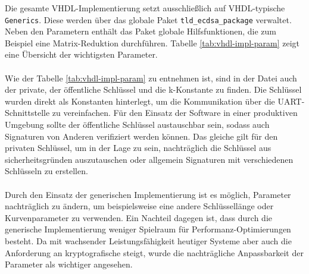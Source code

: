 Die gesamte VHDL-Implementierung setzt ausschließlich auf VHDL-typische \texttt{Generics}. Diese werden über das globale Paket \texttt{tld\_ecdsa\_package} verwaltet. Neben den Parametern enthält das Paket globale Hilfsfunktionen, die zum Beispiel eine Matrix-Reduktion durchführen. Tabelle \ref{tab:vhdl-impl-param} zeigt eine Übersicht der wichtigsten Parameter.
\\ \\
Wie der Tabelle \ref{tab:vhdl-impl-param} zu entnehmen ist, sind in der Datei auch der private, der öffentliche Schlüssel und die k-Konstante  zu finden. Die Schlüssel wurden direkt als Konstanten hinterlegt, um die Kommunikation über die UART-Schnittstelle zu vereinfachen. Für den Einsatz der Software in einer produktiven Umgebung sollte  der öffentliche Schlüssel austauschbar sein, sodass auch Signaturen von Anderen verifiziert werden können. Das gleiche gilt für den privaten Schlüssel, um in der Lage zu sein, nachträglich die Schlüssel aus sicherheitsgründen auszutauschen oder allgemein Signaturen mit verschiedenen Schlüsseln zu erstellen.
\\ \\
Durch den Einsatz der generischen Implementierung ist es möglich, Parameter nachträglich zu ändern, um beispielsweise eine andere Schlüssellänge oder Kurvenparameter zu verwenden. Ein Nachteil dagegen ist, dass durch die generische Implementierung weniger Spielraum für Performanz-Optimierungen besteht. Da mit wachsender Leistungsfähigkeit heutiger Systeme aber auch die Anforderung an kryptografische steigt, wurde die nachträgliche Anpassbarkeit der Parameter als wichtiger angesehen. \\

